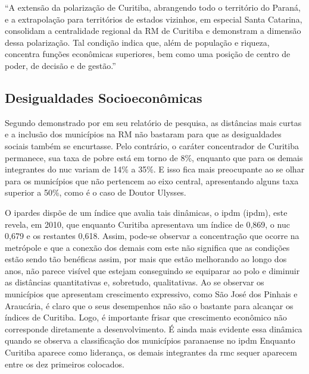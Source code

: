 	\begin{citacao}
		``A extensão da polarização de Curitiba, abrangendo todo o território do Paraná, e a extrapolação para territórios de estados vizinhos, em especial Santa Catarina, consolidam a centralidade regional da RM de Curitiba e demonstram a dimensão dessa polarização. Tal condição indica que, além de população e riqueza, concentra funções econômicas superiores, bem como uma posição de centro de poder, de decisão e de gestão.'' 
	\end{citacao}
	
	\subsection{Desigualdades Socioeconômicas}
	
	Segundo demonstrado por  em seu relatório de pesquisa, as distâncias mais curtas e a inclusão dos municípios na RM não bastaram para que as desigualdades sociais também se encurtasse. Pelo contrário, o caráter concentrador de Curitiba permanece, sua taxa de pobre está em torno de 8\%, enquanto que para os demais integrantes do \gls{nuc} variam de 14\% a 35\%. E isso fica mais preocupante ao se olhar para os municípios que não pertencem ao eixo central, apresentando alguns taxa superior a 50\%, como é o caso de Doutor Ulysses. 
	
	O \gls{ipardes} dispõe de um índice que avalia tais dinâmicas, o \gls{ipdm} (\glsdesc{ipdm}), este revela, em 2010, que enquanto Curitiba apresentava um índice de 0,869, o \gls{nuc} 0,679 e os restantes 0,618. Assim, pode-se observar a concentração que ocorre na metrópole e que a conexão dos demais com este não significa que as condições estão sendo tão benéficas assim, por mais que estão melhorando ao longo dos anos, não parece visível que estejam conseguindo se equiparar ao polo e diminuir as distâncias quantitativas e, sobretudo, qualitativas. Ao se observar os municípios que apresentam crescimento expressivo, como São José dos Pinhais e Araucária, é claro que o seus desempenhos não são o bastante para alcançar os índices de Curitiba. Logo, é importante frisar que crescimento econômico não corresponde diretamente a desenvolvimento. É ainda mais evidente essa dinâmica quando se observa a classificação dos municípios paranaense no \gls{ipdm} Enquanto Curitiba aparece como liderança, os demais integrantes da \gls{rmc} sequer aparecem entre os dez primeiros colocados.
	
